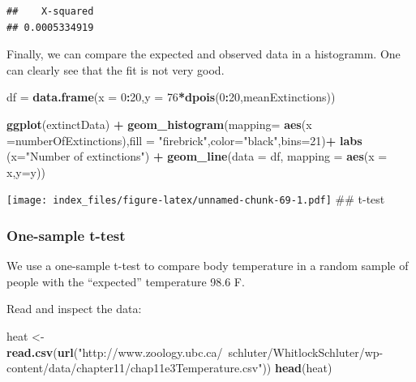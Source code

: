 \documentclass[]{article}
\newenvironment{Shaded}{\begin{snugshade}}{\end{snugshade}}
\newcommand{\DataTypeTok}[1]{\textcolor[rgb]{0.13,0.29,0.53}{#1}}
\newcommand{\DecValTok}[1]{\textcolor[rgb]{0.00,0.00,0.81}{#1}}
\newcommand{\KeywordTok}[1]{\textcolor[rgb]{0.13,0.29,0.53}{\textbf{#1}}}
\newcommand{\NormalTok}[1]{#1}
\newcommand{\OperatorTok}[1]{\textcolor[rgb]{0.81,0.36,0.00}{\textbf{#1}}}
\newcommand{\StringTok}[1]{\textcolor[rgb]{0.31,0.60,0.02}{#1}}
\begin{document}
\begin{verbatim}
##    X-squared 
## 0.0005334919
\end{verbatim}

Finally, we can compare the expected and observed data in a histogramm.
One can clearly see that the fit is not very good.

\begin{Shaded}
\begin{Highlighting}[]
\NormalTok{df =}\StringTok{ }\KeywordTok{data.frame}\NormalTok{(}\DataTypeTok{x =} \DecValTok{0}\OperatorTok{:}\DecValTok{20}\NormalTok{,}\DataTypeTok{y =} \DecValTok{76}\OperatorTok{*}\KeywordTok{dpois}\NormalTok{(}\DecValTok{0}\OperatorTok{:}\DecValTok{20}\NormalTok{,meanExtinctions))}

\KeywordTok{ggplot}\NormalTok{(extinctData) }\OperatorTok{+}
\StringTok{  }\KeywordTok{geom_histogram}\NormalTok{(}\DataTypeTok{mapping=} \KeywordTok{aes}\NormalTok{(}\DataTypeTok{x =}\NormalTok{numberOfExtinctions),}\DataTypeTok{fill =} \StringTok{"firebrick"}\NormalTok{,}\DataTypeTok{color=}\StringTok{"black"}\NormalTok{,}\DataTypeTok{bins=}\DecValTok{21}\NormalTok{)}\OperatorTok{+}\StringTok{    }
\StringTok{  }\KeywordTok{labs}\NormalTok{ (}\DataTypeTok{x=}\StringTok{"Number of extinctions"}\NormalTok{) }\OperatorTok{+}\StringTok{ }
\StringTok{  }\KeywordTok{geom_line}\NormalTok{(}\DataTypeTok{data =}\NormalTok{ df, }\DataTypeTok{mapping =} \KeywordTok{aes}\NormalTok{(}\DataTypeTok{x =}\NormalTok{ x,}\DataTypeTok{y=}\NormalTok{y))}
\end{Highlighting}
\end{Shaded}

\texttt{[image: index\_files/figure-latex/unnamed-chunk-69-1.pdf]} \#\#
t-test

\hypertarget{one-sample-t-test}{%
\subsubsection{One-sample t-test}\label{one-sample-t-test}}

We use a one-sample t-test to compare body temperature in a random
sample of people with the ``expected'' temperature 98.6 F.

Read and inspect the data:

\begin{Shaded}
\begin{Highlighting}[]
\NormalTok{heat <-}\StringTok{ }\KeywordTok{read.csv}\NormalTok{(}\KeywordTok{url}\NormalTok{(}\StringTok{"http://www.zoology.ubc.ca/~schluter/WhitlockSchluter/wp-content/data/chapter11/chap11e3Temperature.csv"}\NormalTok{))}
\KeywordTok{head}\NormalTok{(heat)}
\end{Highlighting}
\end{Shaded}
\end{document}

